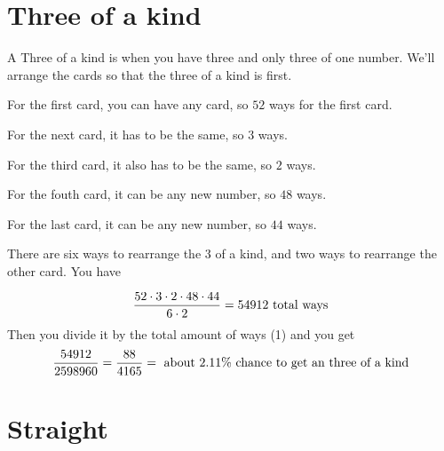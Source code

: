\documentclass[12pt]{article}
\begin{document}
\section{Three of a kind}

A Three of a kind is when you have three and only three of one number.
We'll arrange the cards so that the three of a kind is first.

For the first card, you can have any card, so $52$ ways for the first card.

For the next card, it has to be the same, so $3$ ways.

For the third card, it also has to be the same, so $2$ ways.

For the fouth card, it can be any new number, so $48$ ways.

For the last card, it can be any new number, so $44$ ways.

There are six ways to rearrange the 3 of a kind, and two ways to rearrange the other card.
You have

\begin{equation}
  {52 \cdot 3 \cdot 2 \cdot 48 \cdot 44 \over 6  \cdot 2} = 54912 \hbox{ total ways}
\end{equation}
Then you divide it by the total amount of ways (1) and you get
\begin{equation}
  {54912 \over 2598960} = {88\over4165} = \hbox{ about } 2.11\% \hbox{ chance to get an three of a kind}
\end{equation}
\section{Straight}
\end{document}

